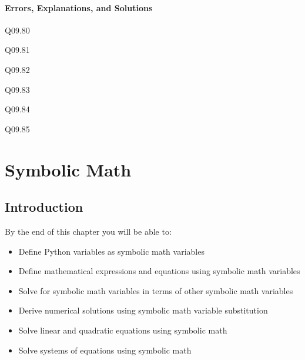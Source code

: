 \documentclass{book}
\begin{document}
    




    
        \subsubsection{Errors, Explanations, and
Solutions}\label{errors-explanations-and-solutions}

Q09.80

Q09.81

Q09.82

Q09.83

Q09.84

Q09.85
    




    
        \chapter{Symbolic Math}\label{symbolic-math}
    




    
        \section{Introduction}\label{introduction}
    




    
        By the end of this chapter you will be able to:

\begin{itemize}
\item
  Define Python variables as symbolic math variables
\item
  Define mathematical expressions and equations using symbolic math
  variables
\item
  Solve for symbolic math variables in terms of other symbolic math
  variables
\item
  Derive numerical solutions using symbolic math variable substitution
\item
  Solve linear and quadratic equations using symbolic math
\item
  Solve systems of equations using symbolic math
\end{itemize}
        \newpage



    
\end{document}
